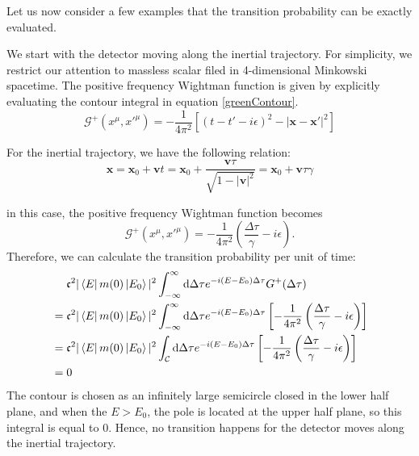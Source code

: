 \documentclass[12pt]{article}
\numberwithin{equation}{section}
\theoremstyle{1style}
\newcommand{\id}{\mathrm{d}}
\begin{document}

Let us now consider a few examples that the transition probability can be exactly evaluated.

\bigskip
We start with the detector moving along the inertial trajectory.
For simplicity, we restrict our attention to massless scalar filed in 4-dimensional Minkowski spacetime.
The positive frequency Wightman function is given by explicitly evaluating the contour integral in equation \ref{greenContour}.
\begin{equation}
  \mathcal{G}^+(x^{\mu},x'^{\mu})=-\frac{1}{4\pi^2}\left[(t-t'-i\epsilon)^2-|\mathbf{x}-\mathbf{x'}|^2\right]
\end{equation}

For the inertial trajectory, we have the following relation:
\begin{equation}
  \mathbf{x}=\mathbf{x}_0+\mathbf{v}t=\mathbf{x}_0+\frac{\mathbf{v}\tau}{\sqrt{1-|\mathbf{v}|^2}}=
  \mathbf{x}_0+\mathbf{v}\tau\gamma
\end{equation}

in this case, the positive frequency Wightman function becomes
\begin{equation}
  \mathcal{G}^+(x^{\mu},x'^{\mu})=-\frac{1}{4\pi^2}\left(\frac{\Delta\tau}{\gamma} -i\epsilon\right).
\end{equation}
Therefore, we can calculate the transition probability per unit of time:
\begin{align}
   & ~~~~\mathfrak{c}^2|\bra{E}m(0)\ket{E_0}|^2\int_{-\infty}^{\infty}\id \Delta\tau e^{-i(E-E_0)\Delta \tau}G^+(\Delta \tau) \\
   & = \mathfrak{c}^2|\bra{E}m(0)\ket{E_0}|^2\int_{-\infty}^{\infty}\id \Delta\tau e^{-i(E-E_0)\Delta \tau}
  \left[-\frac{1}{4\pi^2}\left(\frac{\Delta\tau}{\gamma} -i\epsilon\right)\right]                                             \\
   & = \mathfrak{c}^2|\bra{E}m(0)\ket{E_0}|^2\int_{\mathcal{C}}\id \Delta\tau e^{-i(E-E_0)\Delta \tau}
  \left[-\frac{1}{4\pi^2}\left(\frac{\Delta\tau}{\gamma} -i\epsilon\right)\right]                                             \\
   & = 0
\end{align}
The contour is chosen as an infinitely large semicircle closed in the lower half plane, and when the \(E>E_0\),
the pole is located at the upper half plane, so this integral is equal to \(0\).
Hence, no transition happens for the detector moves along the inertial trajectory.
\end{document}
